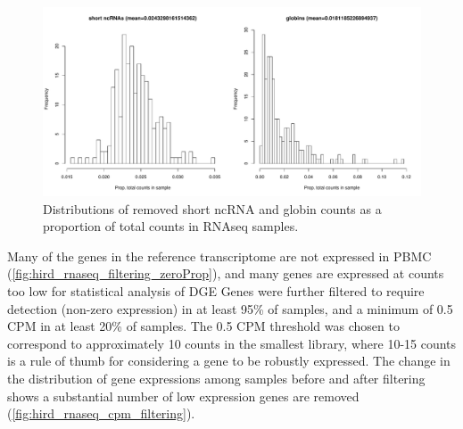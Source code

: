 
\begin{figure}
    \centering
    \includegraphics[width=1.0\textwidth, page=1]{mainmatter/figures/chapter_02/rnaseq_data_setup.per_sample.short_ncRNA_globin_levels_hist.pdf}
    \caption{Distributions of removed short ncRNA and globin counts as a proportion of total counts in \gls{RNAseq} samples.}
    \label{fig:hird_shortncRNA_and_globins}
\end{figure}

Many of the genes in the reference transcriptome are not expressed in \gls{PBMC} (\autoref{fig:hird_rnaseq_filtering_zeroProp}), and many genes are expressed at counts too low for statistical analysis of \gls{DGE}
Genes were further filtered to require detection (non-zero expression) in at least 95\% of samples, and a minimum of 0.5 \gls{CPM} in at least 20\% of samples.
The 0.5 \gls{CPM} threshold was chosen to correspond to approximately 10 counts in the smallest library, where 10-15 counts is a rule of thumb for considering a gene to be robustly expressed\autocite{chen2016ReadsGenesPathways}.
The change in the distribution of gene expressions among samples before and after filtering shows a substantial number of low expression genes are removed (\autoref{fig:hird_rnaseq_cpm_filtering}).

